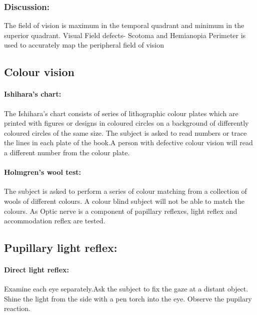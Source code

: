 \documentclass[a4paper,12pt]{book}
\begin{document}
			\subsubsection*{Discussion:}
			The field of vision is maximum in the temporal quadrant and minimum in the superior quadrant.
			Visual Field defects- Scotoma and Hemianopia
			Perimeter is used to accurately map the peripheral field of vision
			\subsection*{Colour vision}
			\paragraph{Ishihara's chart:} The Ishihara's chart consists of series of lithographic colour plates which are printed with figures or designs in coloured circles on a background of differently coloured circles of the same size. The subject is asked to read numbers or trace the lines in each plate of the book.A person with defective colour vision will read a different number from the colour plate.
			\paragraph{Holmgren’s wool test:} The subject is asked to perform a series of colour matching from a collection of wools of different colours. A colour blind subject will not be able to match the colours.
			As Optic nerve is a component of papillary reflexes, light reflex and accommodation reflex are tested.

			\subsection*{Pupillary light reflex:}
			\paragraph{Direct light reflex:}Examine each eye separately.Ask the subject to fix the gaze at a distant object. Shine the light from the side with a pen torch into the eye. Observe the pupilary reaction.
\end{document}

